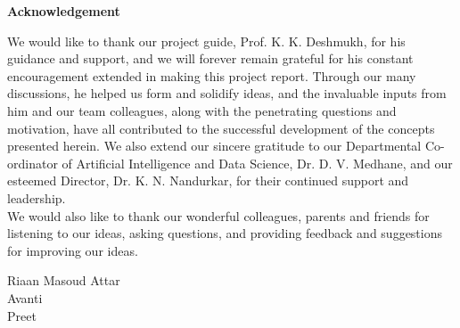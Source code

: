 \begin{center}
\bfseries \fontsize{24}{12} \selectfont Acknowledgement
\end{center}
\vspace*{1\baselineskip}
\hspace*{0.5in}We would like to thank our project guide, Prof. K. K. Deshmukh, for his guidance and support, and we will forever remain grateful for his constant encouragement extended in making this project report. Through our many discussions, he helped us form and solidify ideas, and the invaluable inputs from him and our team colleagues, along with the penetrating questions and motivation, have all contributed to the successful development of the concepts presented herein. We also extend our sincere gratitude to our Departmental Co-ordinator of Artificial Intelligence and Data Science, Dr. D. V. Medhane, and our esteemed Director, Dr. K. N. Nandurkar, for their continued support and leadership.\\

\hspace*{0.3in}We would also like to thank our wonderful colleagues, parents and friends for listening to our ideas, asking questions, and providing feedback and suggestions for improving our ideas.\\

\vspace*{3\baselineskip}
\begin{flushright}
Riaan Masoud Attar \\
Avanti \\
Preet \\
\end{flushright}

